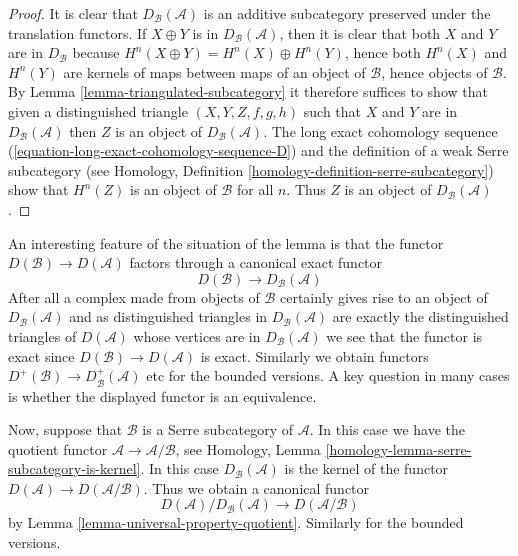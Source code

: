 \begin{proof}
It is clear that $D_\mathcal{B}(\mathcal{A})$ is an additive subcategory
preserved under the translation functors.
If $X \oplus Y$ is in $D_\mathcal{B}(\mathcal{A})$, then it is clear that
both $X$ and $Y$ are in $D_\mathcal{B}$ because
$H^n(X \oplus Y) = H^n(X) \oplus H^n(Y)$, hence both $H^n(X)$ and $H^n(Y)$
are kernels of maps between maps of an object of $\mathcal{B}$, hence
objects of $\mathcal{B}$. By
Lemma \ref{lemma-triangulated-subcategory}
it therefore suffices to show that given a distinguished triangle
$(X, Y, Z, f, g, h)$ such that $X$ and $Y$ are in $D_\mathcal{B}(\mathcal{A})$
then $Z$ is an object of $D_\mathcal{B}(\mathcal{A})$. The long exact
cohomology sequence (\ref{equation-long-exact-cohomology-sequence-D})
and the definition of a weak Serre subcategory (see
Homology, Definition \ref{homology-definition-serre-subcategory})
show that $H^n(Z)$ is an object of $\mathcal{B}$ for all $n$.
Thus $Z$ is an object of $D_\mathcal{B}(\mathcal{A})$.
\end{proof}

\noindent
An interesting feature of the situation of the lemma is that the
functor $D(\mathcal{B}) \to D(\mathcal{A})$ factors through a canonical
exact functor
\begin{equation}
\label{equation-compare}
D(\mathcal{B}) \longrightarrow D_\mathcal{B}(\mathcal{A})
\end{equation}
After all a complex made from objects of $\mathcal{B}$ certainly
gives rise to an object of $D_\mathcal{B}(\mathcal{A})$ and as
distinguished triangles in $D_\mathcal{B}(\mathcal{A})$ are exactly the
distinguished triangles of $D(\mathcal{A})$ whose vertices are in
$D_\mathcal{B}(\mathcal{A})$ we see that the functor is exact since
$D(\mathcal{B}) \to D(\mathcal{A})$ is exact. Similarly we obtain functors
$D^+(\mathcal{B}) \longrightarrow D^+_\mathcal{B}(\mathcal{A})$ etc
for the bounded versions. A key question in many cases is whether the
displayed functor is an equivalence.

\medskip\noindent
Now, suppose that $\mathcal{B}$ is a Serre subcategory of $\mathcal{A}$.
In this case we have the quotient functor
$\mathcal{A} \to \mathcal{A}/\mathcal{B}$, see
Homology, Lemma \ref{homology-lemma-serre-subcategory-is-kernel}.
In this case $D_\mathcal{B}(\mathcal{A})$ is the kernel of the functor
$D(\mathcal{A}) \to D(\mathcal{A}/\mathcal{B})$.
Thus we obtain a canonical functor
$$
D(\mathcal{A})/D_\mathcal{B}(\mathcal{A})
\longrightarrow
D(\mathcal{A}/\mathcal{B})
$$
by
Lemma \ref{lemma-universal-property-quotient}.
Similarly for the bounded versions.

